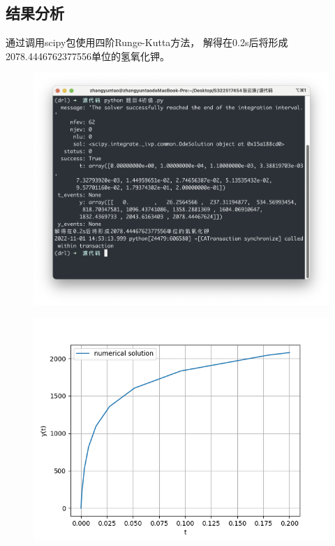 \documentclass{article}
\begin{document}
\subsection{结果分析}
通过调用scipy包使用四阶Runge-Kutta方法，
解得在0.2s后将形成2078.4446762377556单位的氢氧化钾。
\begin{figure}[H]
    \centering
    \includegraphics[width=\textwidth]{相关资源/图片/题目4运行结果1.png} 
\end{figure}
\begin{figure}[H]
    \centering
    \includegraphics[width=\textwidth]{相关资源/图片/题目4运行结果2.png} 
\end{figure}
\end{document}
